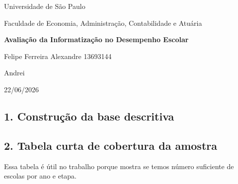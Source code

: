 \documentclass[
  brazilian,
  11pt,
]{article}
\author{}
\date{\vspace{-2.5em}22/06/2026}
\begin{document}
\begin{titlepage}
\centering

\vspace*{2.5cm}

{\Large Universidade de São Paulo \par}

\vspace{0.5cm}

{\large Faculdade de Economia, Administração, Contabilidade e Atuária \par}

\vspace{2.2cm}

{\Huge \textbf{Avaliação da Informatização no Desempenho Escolar} \par}

\vspace{2.5cm}

{\large Felipe Ferreira Alexandre 13693144  \par}

\vspace{0.4cm}

{\large Andrei  \par}

\vspace{0.4cm}

{\large 22/06/2026  \par}

\vfill

\end{titlepage}

\subsection{1. Construção da base
descritiva}\label{construuxe7uxe3o-da-base-descritiva}

\subsection{2. Tabela curta de cobertura da
amostra}\label{tabela-curta-de-cobertura-da-amostra}

Essa tabela é útil no trabalho porque mostra se temos número suficiente
de escolas por ano e etapa.
\end{document}
